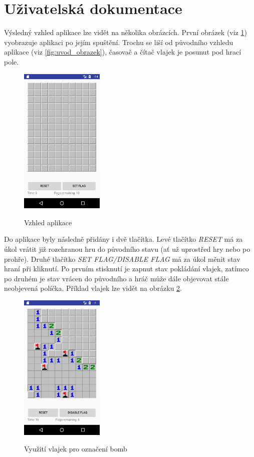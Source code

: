 \documentclass[12pt, a4paper]{article}
\begin{document}
\section{Uživatelská dokumentace}
Výsledný vzhled aplikace lze vidět na několika obrázcích. První obrázek (viz \ref{fig:uvodni}) vyobrazuje aplikaci po jejím spuštění. Trochu se liší od původního vzhledu aplikace (viz \ref{fig:uvod_obrazek}), časovač a čítač vlajek je posunut pod hrací pole.
	\begin{figure}[h!]
	\centering
	\includegraphics[width=4cm]{img/uvodni}\\
	\caption{Vzhled aplikace}
	\label{fig:uvodni}
	\end{figure}
\par
Do aplikace byly následně přidány i dvě tlačítka. Levé tlačítko \textit{RESET} má za úkol vrátit již rozehranou hru do původního stavu (ať už uprostřed hry nebo po prohře). Druhé tlačítko \textit{SET FLAG/DISABLE FLAG} má za úkol měnit stav hraní při kliknutí. Po prvním stisknutí je zapnut stav pokládání vlajek, zatímco po druhém je stav vrácen do původního a hráč může dále objevovat stále neobjevená políčka. Příklad vlajek lze vidět na obrázku \ref{fig:vlajky}.
\newpage
	\begin{figure}[h!]
	\centering
	\includegraphics[width=4cm]{img/vlajky}\\
	\caption{Využití vlajek pro označení bomb}
	\label{fig:vlajky}
	\end{figure}
\end{document}
